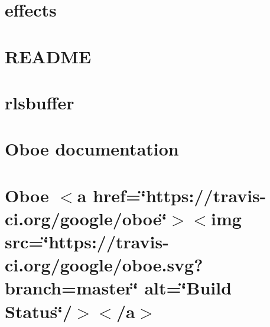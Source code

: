 \let\mypdfximage\pdfximage\def\pdfximage{\immediate\mypdfximage}\documentclass[twoside]{book}
\newcommand{\+}{\discretionary{\mbox{\scriptsize$\hookleftarrow$}}{}{}}
\begin{document}
\chapter{effects}
\label{md__c_1__users_fab_src__github_branches__neural_amp_modeler_plugin_i_plug2__dependencies__build_abce89c5acf0870a329367a088ca8021}

\chapter{R\+E\+A\+D\+ME}
\label{md__c_1__users_fab_src__github_branches__neural_amp_modeler_plugin_i_plug2__dependencies__build_e65bb522111066d1a6d812129edf9ae9}

\chapter{rlsbuffer}
\label{md__c_1__users_fab_src__github_branches__neural_amp_modeler_plugin_i_plug2__dependencies__build_41258f5a222d1bca1cbb3fea5c94e937}

\chapter{Oboe documentation}
\label{md__c_1__users_fab_src__github_branches__neural_amp_modeler_plugin_i_plug2__dependencies__build_e90cf2f99df733e39e056fac0682767c}

\chapter{Oboe $<$a href=\char`\"{}https\+://travis-\/ci.\+org/google/oboe\char`\"{}$>$$<$img src=\char`\"{}https\+://travis-\/ci.\+org/google/oboe.\+svg?branch=master\char`\"{} alt=\char`\"{}\+Build Status\char`\"{}/$>$$<$/a$>$}
\label{md__c_1__users_fab_src__github_branches__neural_amp_modeler_plugin_i_plug2__dependencies__build_9283caff983d7ea2b07e7d06ae94fcf6}

\end{document}
